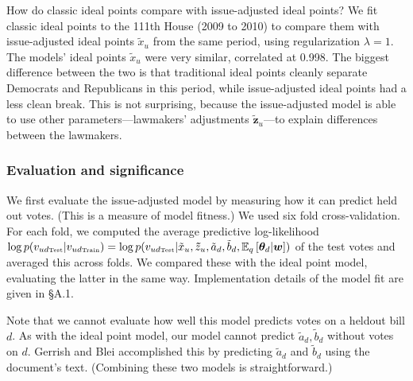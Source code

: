 How do classic ideal points compare with issue-adjusted ideal points?
We fit classic ideal points to the 111th House (2009 to 2010) to
compare them with issue-adjusted ideal points $\tilde x_u$ from the
same period, using regularization $\lambda=1$.
The models' ideal points $\tilde x_u$ were very similar, correlated at 0.998.
The biggest difference between the two is that traditional ideal points
cleanly separate Democrats and Republicans in this period, while
issue-adjusted ideal points had a less clean break. This is not
surprising, because the issue-adjusted model is able to use other
parameters---lawmakers' adjustments $\bm \tilde z_u$---to explain differences
between the lawmakers.

\subsubsection{Evaluation and significance}

We first evaluate the issue-adjusted model by measuring how it can
predict held out votes.  (This is a measure of model fitness.)  We
used six fold cross-validation.  For each fold, we computed the
average predictive log-likelihood $\log p(v_{{ud} \mbox{\tiny Test}} |
v_{{ud} \mbox{\tiny Train}}) = \log p(v_{{ud} \mbox{\tiny Test}} |
\tilde x_u, \bm \tilde z_{u}, \tilde a_d, \tilde b_d, \mathbb{E}_q\left[\bm
  \theta_d | \bm w\right])$ of the test votes and averaged this across
folds.  We compared these with the ideal point model, evaluating the
latter in the same way. Implementation details of the model fit are
given in \S A.1.

Note that we cannot evaluate how well this model predicts votes on a
heldout bill $d$.  As with the ideal point model, our model cannot
predict $\tilde a_d, \tilde b_d$ without votes on $d$.  Gerrish and Blei
\cite{gerrish:2011} accomplished this by predicting $\tilde a_d$ and
$\tilde b_d$ using the document's text. (Combining these two models is
straightforward.)

